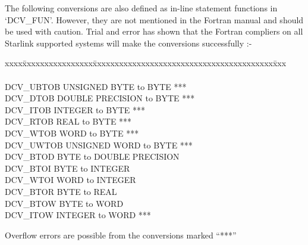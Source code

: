 \newpage

The following conversions are also defined as in-line statement functions in
`DCV\_FUN'. However, they are not mentioned in the Fortran manual and should be
used with caution. Trial and error has shown that the Fortran compliers on all
Starlink supported systems will make the conversions successfully :-

\begin{tabbing}
xxxx\=xxxxxxxxxxxxxxxx\=xxxxxxxxxxxxxxxxxxxxxxxxxxxxxxxxxxxxxxxxx\=xxx\kill 
{}      \\
\\
\>DCV\_UBTOB \>UNSIGNED BYTE to BYTE          \>*** \\
\>DCV\_DTOB  \>DOUBLE PRECISION to BYTE       \>*** \\
\>DCV\_ITOB  \>INTEGER to BYTE                \>*** \\
\>DCV\_RTOB  \>REAL to BYTE                   \>*** \\
\>DCV\_WTOB  \>WORD to BYTE                   \>*** \\
\>DCV\_UWTOB \>UNSIGNED WORD to BYTE          \>*** \\
\>DCV\_BTOD  \>BYTE to DOUBLE PRECISION \\
\>DCV\_BTOI  \>BYTE to INTEGER \\
\>DCV\_WTOI  \>WORD to INTEGER \\
\>DCV\_BTOR  \>BYTE to REAL \\
\>DCV\_BTOW  \>BYTE to WORD \\
\>DCV\_ITOW  \>INTEGER to WORD                \>*** \\
\end{tabbing}
Overflow errors are possible from the conversions marked ``***''

